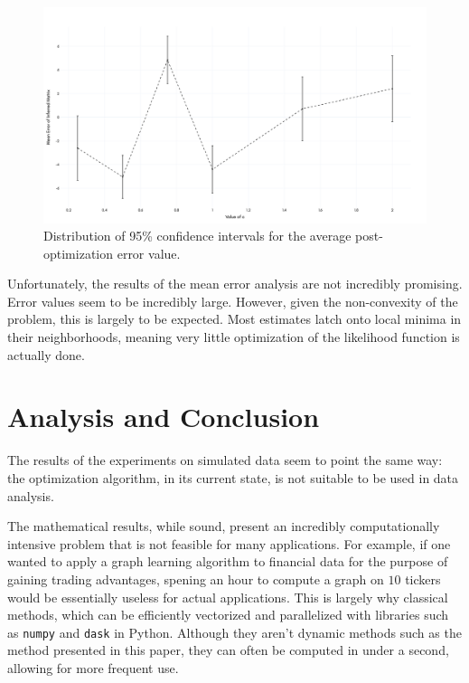 \documentclass{article}
\theoremstyle{definition}
\begin{document}
\begin{figure}[hbt!]
    \par
    \begin{center}
    \caption{Distribution of 95\% confidence intervals for the average post-optimization error value.}
    \label{fig:erroBarOptimError}
    \includegraphics[scale=0.11]{Figures/error_bars_optim.png}
    \end{center}
    \par
    \vspace{-0.25in}
    \medskip
\end{figure}

Unfortunately, the results of the mean error analysis are not incredibly promising. Error values seem to be incredibly large. However, given the non-convexity of the problem, this is largely to be expected. Most estimates latch onto local minima in their neighborhoods, meaning very little optimization of the likelihood function is actually done. 

\section{Analysis and Conclusion}

The results of the experiments on simulated data seem to point the same way: the optimization algorithm, in its current state, is not suitable to be used in data analysis. 

The mathematical results, while sound, present an incredibly computationally intensive problem that is not feasible for many applications. For example, if one wanted to apply a graph learning algorithm to financial data for the purpose of gaining trading advantages, spening an hour to compute a graph on $10$ tickers would be essentially useless for actual applications. This is largely why classical methods, which can be efficiently vectorized and parallelized with libraries such as \texttt{numpy} and \texttt{dask} in Python. Although they aren't dynamic methods such as the method presented in this paper, they can often be computed in under a second, allowing for more frequent use.
\end{document}
